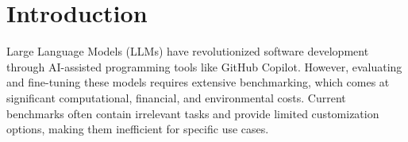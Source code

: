 %
%

\chapter{Introduction}




Large Language Models (LLMs) have revolutionized software development through AI-assisted programming tools like GitHub Copilot. However, evaluating and fine-tuning these models requires extensive benchmarking, which comes at significant computational, financial, and environmental costs. Current benchmarks often contain irrelevant tasks and provide limited customization options, making them inefficient for specific use cases.

